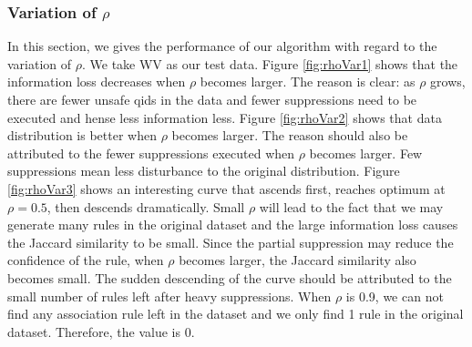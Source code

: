 \subsubsection{Variation of $\rho$}
In this section, we gives the performance of our algorithm with regard
to the variation of $\rho$. We take WV as our test data.
Figure \ref{fig:rhoVar1} shows that
the information loss decreases when $\rho$ becomes larger. The reason is
clear: as $\rho$ grows, there are fewer unsafe qids in the data and
fewer suppressions need to be executed and hense less information less.
Figure \ref{fig:rhoVar2} shows that data distribution
is better when $\rho$ becomes larger. The reason should also be attributed to
the fewer suppressions executed when $\rho$ becomes larger. Few suppressions mean
less disturbance to the original distribution.
Figure \ref{fig:rhoVar3} shows an interesting curve that ascends first,
reaches optimum at $\rho=0.5$,
then descends dramatically.
Small $\rho$ will lead to the fact that we may generate many rules in
the original dataset and the large information loss
causes the Jaccard similarity to be small. Since the partial suppression
may reduce the confidence of the rule, when $\rho$ becomes larger,
the Jaccard similarity also becomes small.
The sudden descending of the curve should be attributed to
the small number of rules left after heavy suppressions.
When $\rho$ is 0.9, we can not find any
association rule left in the dataset and we only find 1 rule in the
original dataset. Therefore, the value is 0.


